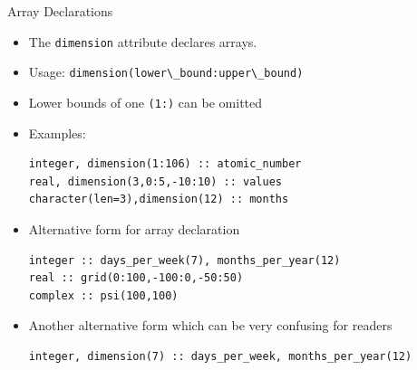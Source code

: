 \documentclass[c,mathserif,compress,xcolor=svgnames]{beamer}
\newcommand{\lstfortran}[1]{\lstinline[language={[90]Fortran},basicstyle=\footnotesize\ttfamily]|#1|}
\begin{document}
\begin{frame}[fragile]{Array Declarations}
  \begin{itemize}
    \item The \lstfortran{dimension} attribute declares arrays.
    \item Usage: \lstfortran{dimension(lower\_bound:upper\_bound)}
    \item[] Lower bounds of one \lstfortran{(1:)} can be omitted
    \item Examples:
      \begin{lstlisting}[language={[90]Fortran}]
integer, dimension(1:106) :: atomic_number
real, dimension(3,0:5,-10:10) :: values
character(len=3),dimension(12) :: months
      \end{lstlisting}
    \item Alternative form for array declaration
      \begin{lstlisting}[language={[90]Fortran}]
integer :: days_per_week(7), months_per_year(12)
real :: grid(0:100,-100:0,-50:50)
complex :: psi(100,100)
      \end{lstlisting}
    \item Another alternative form which can be very confusing for readers
      \begin{lstlisting}[language={[90]Fortran}]
integer, dimension(7) :: days_per_week, months_per_year(12)
      \end{lstlisting}
  \end{itemize}
\end{frame}
\end{document}
